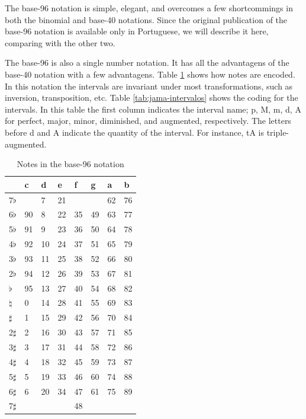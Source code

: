 \documentclass{article}
\begin{document}
The base-96 notation is simple, elegant, and overcomes a few
shortcommings in both the binomial and base-40 notations. Since the
original publication of the base-96 notation is available only in
Portuguese, we will describe it here, comparing with the other
two.

The base-96 is also a single number notation. It has all the
advantagens of the base-40 notation with a few advantagens. Table
\ref{tab:jama-notas} shows how notes are encoded. In this notation the
intervals are invariant under most transformations, such as inversion,
transposition, etc. Table \ref{tab:jama-intervalos} shows the coding
for the intervals. In this table the first column indicates the
interval name; p, M, m, d, A for perfect, major, minor, diminished,
and augmented, respectively. The letters before d and A indicate the
quantity of the interval. For instance, tA is triple-augmented.

\begin{table}
  \centering
  \begin{tabular}{l|lllllll}
               & c & d& e& f& g& a& b \\
    \hline
    7$\flat$   &   & 7&21&  &  &62&76 \\
    6$\flat$   & 90& 8&22&35&49&63&77 \\
    5$\flat$   & 91& 9&23&36&50&64&78 \\
    4$\flat$   & 92&10&24&37&51&65&79 \\
    3$\flat$   & 93&11&25&38&52&66&80 \\
    2$\flat$   & 94&12&26&39&53&67&81 \\
    $\flat$    & 95&13&27&40&54&68&82 \\
    $\natural$ &  0&14&28&41&55&69&83 \\
    $\sharp$   &  1&15&29&42&56&70&84 \\
    2$\sharp$  &  2&16&30&43&57&71&85 \\
    3$\sharp$  &  3&17&31&44&58&72&86 \\
    4$\sharp$  &  4&18&32&45&59&73&87 \\
    5$\sharp$  &  5&19&33&46&60&74&88 \\
    6$\sharp$  &  6&20&34&47&61&75&89 \\
    7$\sharp$  &   &  &  &48&  &  &   \\
  \end{tabular}
  \caption{Notes in the base-96 notation}
  \label{tab:jama-notas}
\end{table}
\end{document}
